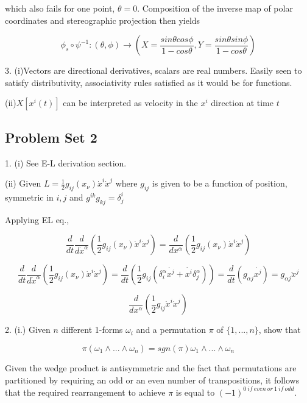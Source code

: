 \documentclass{article}\usepackage[]{graphicx}\usepackage[]{color}
\begin{document}
which also fails for one point, $\theta=0$. Composition of the inverse map of polar coordinates and stereographic projection then yields

$$
\phi_s\circ\psi^{-1} :(\theta,\phi)\rightarrow (X=\frac{sin\theta cos\phi}{1-cos\theta},Y=\frac{sin\theta sin\phi}{1-cos\theta})
$$

3. (i)Vectors are directional derivatives, scalars are real numbers. Easily seen to satisfy distributivity, associativity rules satisfied as it would be for functions.

(ii)$X[x^i(t)]$ can be interpreted as velocity in the $x^i$ direction at time $t$

\pagebreak

\subsection{Problem Set 2}

1. (i) See E-L derivation section. %

(ii) Given $L=\frac{1}{2}g_{ij}(x_{\nu})\dot{x}^i\dot{x}^j$ where $g_{ij}$ is given to be a function of position, symmetric in $i,j$ and $g^{ik}g_{kj}=\delta^i_j$

Applying EL eq.,

$$
\frac{d}{dt}\frac{d}{d\dot{x}^{\alpha}}\left(
\frac{1}{2}g_{ij}(x_{\nu})\dot{x}^i\dot{x}^j
\right)=\frac{d}{dx^{\alpha}}\left(
\frac{1}{2}g_{ij}(x_{\nu})\dot{x}^i\dot{x}^j
\right)
$$


$$
\frac{d}{dt}\frac{d}{d\dot{x}^{\alpha}}\left(
\frac{1}{2}g_{ij}(x_{\nu})\dot{x}^i\dot{x}^j
\right)= \frac{d}{dt}\left( \frac{1}{2}g_{ij}(\delta^{\alpha}_{i}\dot{x^j}+\dot{x^i}\delta^{\alpha}_{j})\right)=\frac{d}{dt}\left( g_{\alpha j}\dot{x^j}\right)=g_{\alpha j}\ddot{x}^j
$$

$$
\frac{d}{dx^{\alpha}}\left(
\frac{1}{2}g_{ij}\dot{x}^i\dot{x}^j
\right)
$$


2. (i.) Given $n$ different 1-forms $\omega_i$ and a permutation $\pi$ of $\lbrace 1,...,n\rbrace$, show that 

$$
\pi(\omega_1\wedge ... \wedge \omega_n)= sgn(\pi)\omega_1\wedge...\wedge\omega_n
$$

Given the wedge product is antisymmetric and the fact that permutations are partitioned by requiring an odd or an even number of transpositions, it follows that the required rearrangement to achieve $\pi$ is equal to $(-1)^{0\ if\ even \ or\ 1\ if \ odd}$.
\end{document}
